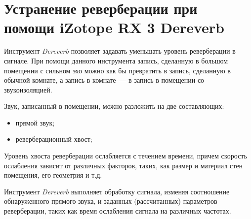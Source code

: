 \documentclass{beamer}
\begin{document}
\section[iZotope RX 3 Dereverb]{Устранение реверберации при помощи iZotope RX 3 Dereverb}
\begin{frame}
Инструмент \emph{Dereverb} позволяет задавать уменьшать уровень реверберации в сигнале. При помощи данного инструмента запись, сделанную в большом помещении с сильном эхо можно как бы превратить в запись, сделанную в обычной комнате, а запись в комнате~--- в запись в помещении со звукоизоляцией.

\end{frame}
\begin{frame}
Звук, записанный в помещении, можно разложить на две составляющих:
\begin{itemize}
  \item прямой звук;
  \item реверберационный хвост;
\end{itemize}

Уровень хвоста реверберации ослабляется с течением времени, причем скорость ослабления зависит от различных факторов, таких, как размер и материал стен помещения, его геометрия и т.д.

Инструмент \emph{Dereverb} выполняет обработку сигнала, изменяя соотношение обнаруженного прямого звука, и заданных (рассчитанных) параметров реверберации, таких как время ослабления сигнала на различных частотах.
\end{frame}
\end{document}
